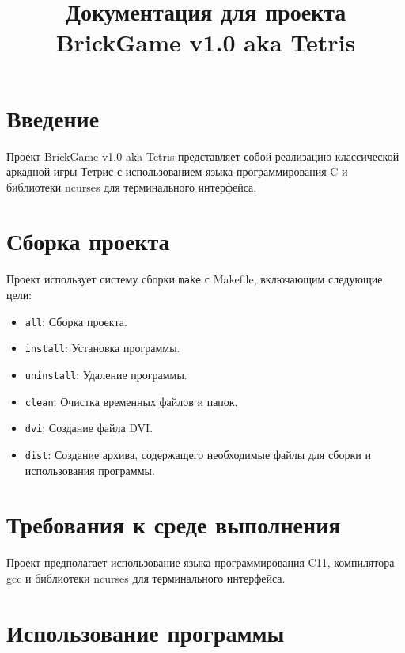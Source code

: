 \documentclass{article}
\begin{document}
\title{Документация для проекта BrickGame v1.0 aka Tetris}
\date{}
\maketitle

\section{Введение}

Проект BrickGame v1.0 aka Tetris представляет собой реализацию классической аркадной игры Тетрис с использованием языка программирования C и библиотеки ncurses для терминального интерфейса.

\section{Сборка проекта}

Проект использует систему сборки \texttt{make} с Makefile, включающим следующие цели:

\begin{itemize}
    \item \texttt{all}: Сборка проекта.
    \item \texttt{install}: Установка программы.
    \item \texttt{uninstall}: Удаление программы.
    \item \texttt{clean}: Очистка временных файлов и папок.
    \item \texttt{dvi}: Создание файла DVI.
    \item \texttt{dist}: Создание архива, содержащего необходимые файлы для сборки и использования программы.
\end{itemize}

\section{Требования к среде выполнения}

Проект предполагает использование языка программирования C11, компилятора gcc и библиотеки ncurses для терминального интерфейса.

\section{Использование программы}
\end{document}
